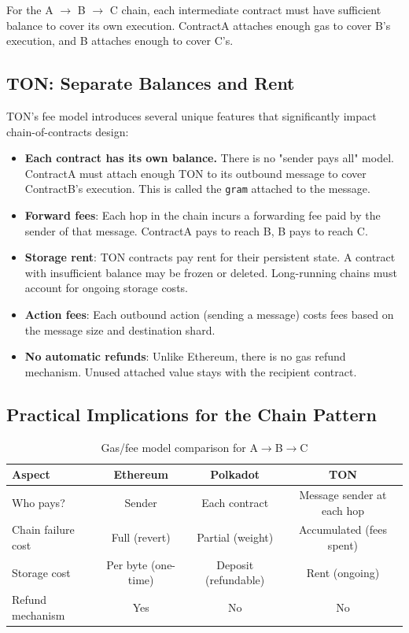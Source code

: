 For the A $\to$ B $\to$ C chain, each intermediate contract must have sufficient
balance to cover its own execution. ContractA attaches enough gas to cover B's
execution, and B attaches enough to cover C's.

\subsection{TON: Separate Balances and Rent}

TON's fee model introduces several unique features that significantly impact
chain-of-contracts design:

\begin{itemize}
    \item \textbf{Each contract has its own balance.} There is no "sender pays
          all" model. ContractA must attach enough TON to its outbound message
          to cover ContractB's execution. This is called the \texttt{gram}
          attached to the message.
    \item \textbf{Forward fees}: Each hop in the chain incurs a forwarding fee
          paid by the sender of that message. ContractA pays to reach B, B pays
          to reach C.
    \item \textbf{Storage rent}: TON contracts pay rent for their persistent
          state. A contract with insufficient balance may be frozen or deleted.
          Long-running chains must account for ongoing storage costs.
    \item \textbf{Action fees}: Each outbound action (sending a message) costs
          fees based on the message size and destination shard.
    \item \textbf{No automatic refunds}: Unlike Ethereum, there is no gas refund
          mechanism. Unused attached value stays with the recipient contract.
\end{itemize}

\subsection{Practical Implications for the Chain Pattern}

\begin{table}[h]
\centering
\begin{tabular}{|l|c|c|c|}
\hline
\textbf{Aspect} & \textbf{Ethereum} & \textbf{Polkadot} & \textbf{TON} \\
\hline
Who pays? & Sender & Each contract & Message sender at each hop \\
Chain failure cost & Full (revert) & Partial (weight) & Accumulated (fees spent) \\
Storage cost & Per byte (one-time) & Deposit (refundable) & Rent (ongoing) \\
Refund mechanism & Yes & No & No \\
\hline
\end{tabular}
\caption{Gas/fee model comparison for A$\to$B$\to$C}
\end{table}

